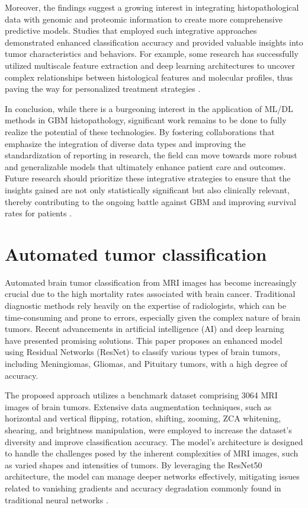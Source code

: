 \documentclass[runningheads]{llncs}
\begin{document}
Moreover, the findings suggest a growing interest in integrating histopathological data with genomic and proteomic information to create more comprehensive predictive models. Studies that employed such integrative approaches demonstrated enhanced classification accuracy and provided valuable insights into tumor characteristics and behaviors. For example, some research has successfully utilized multiscale feature extraction and deep learning architectures to uncover complex relationships between histological features and molecular profiles, thus paving the way for personalized treatment strategies \cite{Chun_2025}.

In conclusion, while there is a burgeoning interest in the application of ML/DL methods in GBM histopathology, significant work remains to be done to fully realize the potential of these technologies. By fostering collaborations that emphasize the integration of diverse data types and improving the standardization of reporting in research, the field can move towards more robust and generalizable models that ultimately enhance patient care and outcomes. Future research should prioritize these integrative strategies to ensure that the insights gained are not only statistically significant but also clinically relevant, thereby contributing to the ongoing battle against GBM and improving survival rates for patients \cite{Chun_2025}.
\section{Automated tumor classification}
Automated brain tumor classification from MRI images has become increasingly crucial due to the high mortality rates associated with brain cancer. Traditional diagnostic methods rely heavily on the expertise of radiologists, which can be time-consuming and prone to errors, especially given the complex nature of brain tumors. Recent advancements in artificial intelligence (AI) and deep learning have presented promising solutions. This paper proposes an enhanced model using Residual Networks (ResNet) to classify various types of brain tumors, including Meningiomas, Gliomas, and Pituitary tumors, with a high degree of accuracy.

The proposed approach utilizes a benchmark dataset comprising 3064 MRI images of brain tumors. Extensive data augmentation techniques, such as horizontal and vertical flipping, rotation, shifting, zooming, ZCA whitening, shearing, and brightness manipulation, were employed to increase the dataset's diversity and improve classification accuracy. The model's architecture is designed to handle the challenges posed by the inherent complexities of MRI images, such as varied shapes and intensities of tumors. By leveraging the ResNet50 architecture, the model can manage deeper networks effectively, mitigating issues related to vanishing gradients and accuracy degradation commonly found in traditional neural networks \cite{Sarah_2020}.
\end{document}
